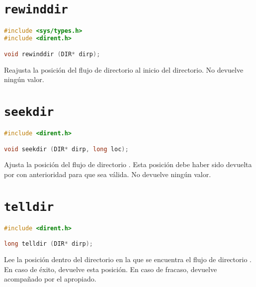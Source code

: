 \section{\texttt{rewinddir}}\label{rewinddir}

\begin{lstlisting}[language=C]
#include <sys/types.h>
#include <dirent.h>

void rewinddir (DIR* dirp);
\end{lstlisting}

Reajusta la posición del flujo de directorio  al inicio del directorio.
No devuelve ningún valor.

\section{\texttt{seekdir}}\label{seekdir}

\begin{lstlisting}[language=C]
#include <dirent.h>

void seekdir (DIR* dirp, long loc);
\end{lstlisting}

Ajusta la posición del flujo de directorio .
Esta posición debe haber sido devuelta por  con anterioridad para que sea válida.
No devuelve ningún valor.

\section{\texttt{telldir}}\label{telldir}

\begin{lstlisting}[language=C]
#include <dirent.h>

long telldir (DIR* dirp);
\end{lstlisting}

Lee la posición dentro del directorio en la que se encuentra el flujo de directorio .
En caso de éxito, devuelve esta posición.
En caso de fracaso, devuelve  acompañado por el  apropiado.

